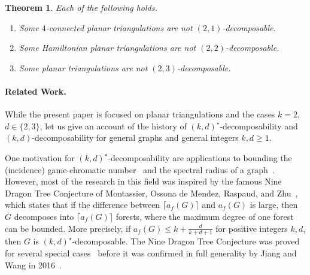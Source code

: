 \documentclass[a4paper,10pt]{article}
\theoremstyle{plain}
\newtheorem{thm}{Theorem}[section]
\begin{document}
\begin{thm}\label{thm:best-possible}
 Each of the following holds.
 \begin{enumerate}[label = (\roman*)]
  \item Some $4$-connected planar triangulations are not $(2,1)$-decomposable.\label{enum:4-connected-not-2,1}
  
  \item Some Hamiltonian planar triangulations are not $(2,2)$-decomposable.\label{enum:Hamiltonian-not-2,2}
  
  \item Some planar triangulations are not $(2,3)$-decomposable.\label{enum:planar-not-2,3}
 \end{enumerate}
\end{thm}



\paragraph{Related Work.}

While the present paper is focused on planar triangulations and the cases $k=2$, $d \in \{2,3\}$, let us give an account of the history of $(k,d)^\star$-decomposability and $(k,d)$-decomposability for general graphs and general integers $k,d \geq 1$.

One motivation for $(k,d)^\star$-decomposability are applications to bounding the (incidence) game-chromatic number~\cite{He-02,Mon-10,Cha-15} and the spectral radius of a graph~\cite{Dvo-10}.
However, most of the research in this field was inspired by the famous Nine Dragon Tree Conjecture of Montassier, Ossona de Mendez, Raspaud, and Zhu~\cite{Mon-12}, which states that if the difference between $\lceil a_f(G)\rceil$ and $a_f(G)$ is large, then $G$ decomposes into $\lceil a_f(G) \rceil$ forests, where the maximum degree of one forest can be bounded.
More precisely, if $a_f(G)\leq k+\frac{d}{k+d+1}$ for positive integers $k,d$, then $G$ is $(k,d)^\star$-decomposable.
The Nine Dragon Tree Conjecture was proved for several special cases~\cite{Kai-11,Mon-12,Kim-13,Che-17} before it was confirmed in full generality by Jiang and Wang in 2016~\cite{Jia-16}.
\end{document}
